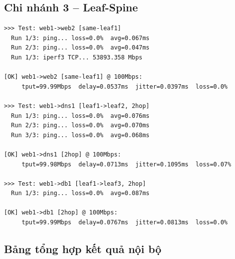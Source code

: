 \subsection{Chi nhánh 3 -- Leaf-Spine}

\begin{lstlisting}[style=termstyle, caption={Log đo lường intra-branch -- Leaf-Spine Network}]
>>> Test: web1->web2 [same-leaf1]
  Run 1/3: ping... loss=0.0%  avg=0.067ms
  Run 2/3: ping... loss=0.0%  avg=0.047ms
  Run 1/3: iperf3 TCP... 53893.358 Mbps

[OK] web1->web2 [same-leaf1] @ 100Mbps:
     tput=99.99Mbps  delay=0.0537ms  jitter=0.0397ms  loss=0.0%

>>> Test: web1->dns1 [leaf1->leaf2, 2hop]
  Run 1/3: ping... loss=0.0%  avg=0.076ms
  Run 2/3: ping... loss=0.0%  avg=0.070ms
  Run 3/3: ping... loss=0.0%  avg=0.068ms

[OK] web1->dns1 [2hop] @ 100Mbps:
     tput=99.98Mbps  delay=0.0713ms  jitter=0.1095ms  loss=0.07%

>>> Test: web1->db1 [leaf1->leaf3, 2hop]
  Run 1/3: ping... loss=0.0%  avg=0.087ms

[OK] web1->db1 [2hop] @ 100Mbps:
     tput=99.99Mbps  delay=0.0767ms  jitter=0.0813ms  loss=0.0%
\end{lstlisting}

\subsection{Bảng tổng hợp kết quả nội bộ}

